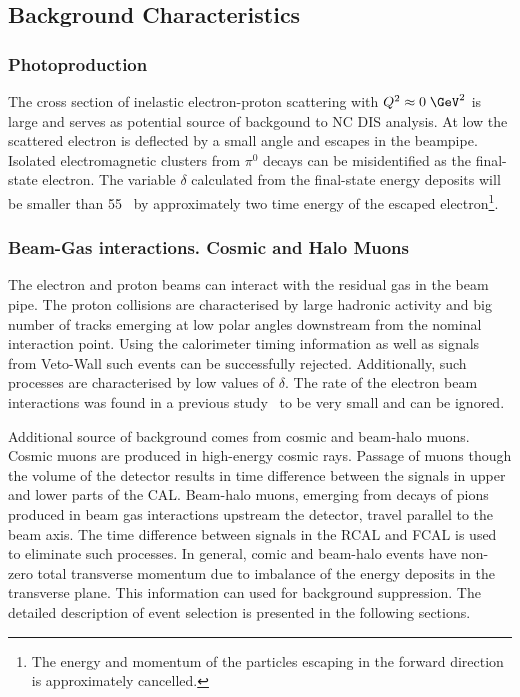 \subsection{Background Characteristics}
\label{subsec:bgchar}

\subsubsection{Photoproduction}
\label{subsubsec:photoprodbg}
The cross section of inelastic electron-proton scattering with $\qsq \approx 0\;\GeV^2$ is large and serves as potential source of backgound to NC DIS analysis. At low \qsq the scattered electron is deflected by a small angle and escapes in the beampipe. Isolated electromagnetic clusters from $\pi^0$ decays can be misidentified as the final-state electron. The variable $\delta$ calculated from the final-state energy deposits will be smaller than 55 \GeV~by approximately two time energy of the escaped electron\footnote{The energy and momentum of the particles escaping in the forward direction is approximately cancelled.}.

\subsubsection{Beam-Gas interactions. Cosmic and Halo Muons}
\label{subsubsec:beamgasfeatures}
The electron and proton beams can interact with the residual gas in the beam pipe. The proton collisions are characterised by large hadronic activity and big number of tracks emerging at low polar angles downstream from the nominal interaction point. Using the calorimeter timing information as well as signals from Veto-Wall such events can be successfully rejected. Additionally, such processes are characterised by low values of $\delta$. The rate of the electron beam interactions was found in a previous study~\cite{thesis:moritz:2001} to be very small and can be ignored.

Additional source of background comes from cosmic and beam-halo muons. Cosmic muons are produced in high-energy cosmic rays. Passage of muons though the volume of the detector results in time difference between the signals in upper and lower parts of the CAL. Beam-halo muons, emerging from decays of pions produced in beam gas interactions upstream the detector, travel parallel to the beam axis. The time difference between signals in the RCAL and FCAL is used to eliminate such processes. In general, comic and beam-halo events have non-zero total transverse momentum due to imbalance of the energy deposits in the transverse plane. This information can used for background suppression. The detailed description of event selection is presented in the following sections.

